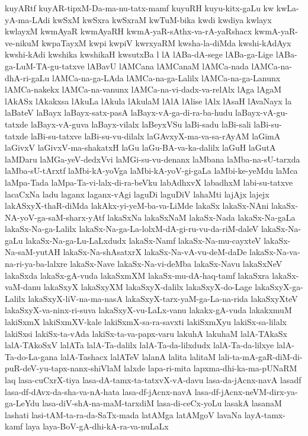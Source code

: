 {kuyARtf
kuyAR-tipxM-Da-ma-nu-tatx-mamf
kuyuRH
kuyu-kitx-gaLu
kw
kwLa-yA-ma-LAdi
kwSxM
kwSxra
kwSxraM
kwTuM-bika
kwdi
kwdiya
kwlayx
kwlayxM
kwmAyaR
kwmAyaRH
kwmA-yaR-sAthx-va-rA-yaRshacx
kwmA-yaR-ve-nikuM
kwpaTayxM
kwpi
kwpiV
kwrxyaRM
kwsha-la-diMda
kwshi-kAdAyx
kwshi-kAdi
kwshika
kwshikaH
kwsutxBa
l
lA
lABa-dA-sege
lABa-ga-Lige
lABa-ga-LuM-TA-gu-tatxve
lABavU
lAMCana
lAMCanaM
lAMCa-nada
lAMCa-na-dhA-ri-gaLu
lAMCa-na-ga-LAda
lAMCa-na-ga-Lalilx
lAMCa-na-ga-Lanunx
lAMCa-nakekx
lAMCa-na-vanunx
lAMCa-na-vi-dadx-va-relAlx
lAga
lAgaM
lAkASx
lAkakxsa
lAkuLa
lAkula
lAkulaM
lAlA
lAlise
lAlx
lAsaH
lAvaNayx
la
laBateV
laBayx
laBayx-satx-pasA
laBayx-vA-ga-di-ra-ba-hudu
laBayx-vA-gu-tatxde
laBayx-vA-guva
laBayx-vilalx
laBeyxVSu
laBi-sadu
laBi-sali
laBi-su-tatxde
laBi-su-tatxve
laBi-su-vu-dilalx
laGAvxyX-ma-va-sa-rAyAM
laGimA
laGivxV
laGivxV-ma-shakatxH
laGu
laGu-BA-va-ka-dalilx
laGuH
laGutA
laMDaru
laMGa-yeV-dedxVvi
laMGi-su-vu-denanx
laMbana
laMba-na-sU-tarxda
laMba-sU-tArxtf
laMbi-kA-yoVga
laMbi-kA-yoV-gi-gaLa
laMbi-ke-yeMdu
laMca
laMpa-Tada
laMpa-Ta-vi-lalx-di-ra-beVku
labAdhxvX
labadhxM
labi-su-tatxve
lacaCxNa
ladu
laganx
laganx-vAgi
laguDi
laguDiV
lahaMti
lajAjx
lajejx
lakASxyX-thaR-diMda
lakAkx-yi-yeM-ba-va-LiMde
lakaSx
lakaSx-NAni
lakaSx-NA-yoV-ga-saM-sharx-yAtf
lakaSxNa
lakaSxNaM
lakaSx-Nada
lakaSx-Na-gaLa
lakaSx-Na-ga-Lalilx
lakaSx-Na-ga-La-lolxM-dA-gi-ru-vu-da-riM-daleV
lakaSx-Na-gaLu
lakaSx-Na-ga-Lu-LaLxdudx
lakaSx-Namf
lakaSx-Na-mu-cayxteV
lakaSx-Na-saM-yutAH
lakaSx-Na-shAsatxrX
lakaSx-Na-vA-vu-deM-daDe
lakaSx-Na-va-na-ri-ya-ba-lalxre
lakaSx-Nave
lakaSx-Na-vi-deMba
lakaSx-Navu
lakaSxNeV
lakaSxda
lakaSx-gA-vuda
lakaSxmXM
lakaSx-mu-dA-haq-tamf
lakaSxra
lakaSx-vaM-danu
lakaSxyX
lakaSxyXM
lakaSxyX-dalilx
lakaSxyX-do-Lage
lakaSxyX-ga-Lalilx
lakaSxyX-liV-na-ma-nasA
lakaSxyX-tarx-yaM-ga-La-na-rida
lakaSxyXteV
lakaSxyX-va-ninx-ri-suva
lakaSxyX-vu-LaLx-vanu
lakakx-gA-vuda
lakakxmuM
lakiSxmX
lakiSxmXV-kale
lakiSxmX-sa-ra-savxti
lakiSxmXyu
lakiSx-sa-lilalx
lakiSxsi
lakiSx-ta-vAda
lakiSx-ta-va-papx-varu
lakuhA
lakuhaM
lalA-TAkaSx
lalA-TAkoSxV
lalATa
lalA-Ta-dalilx
lalA-Ta-da-lilxdudx
lalA-Ta-da-lilxye
lalA-Ta-do-La-gana
lalA-Tashacx
lalATeV
lalanA
lalita
lalitaM
lali-ta-mA-gaR-diM-di-puR-deV-yu-tapx-nanx-shiVlaM
lalxde
lapa-ri-mita
lapxma-dhi-ka-ma-pUNaRM
laq
lasa-cuCxrX-tiya
lasa-dA-tamx-ta-tatxvX-vA-davu
lasa-da-jAcnx-navA
lasadf
lasa-df-dAvx-da-sha-va-nA-hata
lasa-df-jAcnx-navA
lasa-df-jAcnx-neVM-dirx-ya-ga-LeYdu
lasa-diV-shA-na-maM-tarxdiM
lasa-di-ceCx-yoLu
lasakA
lasanaM
lashati
lasi-tAM-ta-ra-da-SaTx-mada
latAMga
latAMgoV
lavaNa
layA-tamx-kamf
laya
laya-BoV-gA-dhi-kA-ra-va-nuLaLx
}
